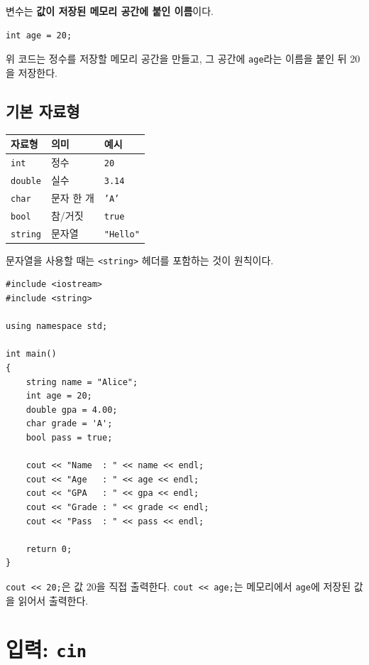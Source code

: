 \documentclass[11pt,a4paper]{article}
\begin{document}
변수는 \textbf{값이 저장된 메모리 공간에 붙인 이름}이다.

\begin{lstlisting}
int age = 20;
\end{lstlisting}

위 코드는 정수를 저장할 메모리 공간을 만들고, 그 공간에 \texttt{age}라는 이름을 붙인 뒤 20을 저장한다.

\subsection{기본 자료형}

\begin{center}
\begin{tabular}{lll}
\toprule
자료형 & 의미 & 예시 \\
\midrule
\texttt{int} & 정수 & \texttt{20} \\
\texttt{double} & 실수 & \texttt{3.14} \\
\texttt{char} & 문자 한 개 & \texttt{'A'} \\
\texttt{bool} & 참/거짓 & \texttt{true} \\
\texttt{string} & 문자열 & \texttt{"Hello"} \\
\bottomrule
\end{tabular}
\end{center}

문자열을 사용할 때는 \texttt{<string>} 헤더를 포함하는 것이 원칙이다.

\begin{lstlisting}
#include <iostream>
#include <string>

using namespace std;

int main()
{
    string name = "Alice";
    int age = 20;
    double gpa = 4.00;
    char grade = 'A';
    bool pass = true;

    cout << "Name  : " << name << endl;
    cout << "Age   : " << age << endl;
    cout << "GPA   : " << gpa << endl;
    cout << "Grade : " << grade << endl;
    cout << "Pass  : " << pass << endl;

    return 0;
}
\end{lstlisting}

\begin{importantbox}
\texttt{cout << 20;}은 값 20을 직접 출력한다.
\texttt{cout << age;}는 메모리에서 \texttt{age}에 저장된 값을 읽어서 출력한다.
\end{importantbox}

\section{입력: \texttt{cin}}
\end{document}
